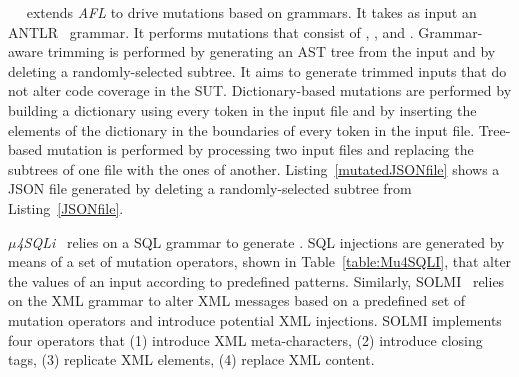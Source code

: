 


~\Superion~ extends \emph{AFL} to drive mutations based on grammars. It takes as input an ANTLR~\cite{ANTLR} grammar. 
It performs mutations that consist of , , and .
Grammar-aware trimming is performed by generating an AST tree from the input and by deleting a randomly-selected subtree. 
It aims to generate trimmed inputs that do not alter code coverage in the SUT.
Dictionary-based mutations are performed by building a dictionary using every token in the input file and by inserting the elements of the dictionary in the boundaries of every token in the input file.
Tree-based mutation is performed by processing two input files and replacing the subtrees of one file with the ones of another.
Listing~\ref{mutatedJSONfile} shows a JSON file generated by deleting a randomly-selected subtree from Listing~\ref{JSONfile}.








\emph{$\mu$4SQLi}~\cite{Appelt:SQLI:ISSTA:2014} relies on a SQL grammar to generate . 
SQL injections are generated by means of a set of mutation operators, shown in Table~\ref{table:Mu4SQLI}, that alter the values of an input according to predefined patterns.
Similarly, SOLMI~\cite{Jan:ISSTA:2016} relies on the XML grammar to alter XML messages based on a predefined set of mutation operators and introduce potential XML injections. 
SOLMI implements four operators that (1) introduce XML meta-characters, (2) introduce closing tags, (3) replicate XML elements, (4) replace XML content.


